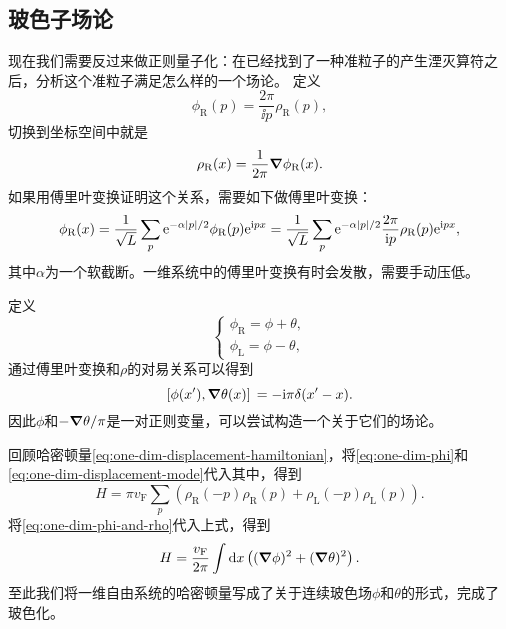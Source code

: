 \subsection{玻色子场论}

现在我们需要反过来做正则量子化：在已经找到了一种准粒子的产生湮灭算符之后，分析这个准粒子满足怎么样的一个场论。
定义
\begin{equation}
    {\phi}_\text{R}(p) = \frac{2\pi}{\ii p} {\rho}_\text{R}(p),
    \label{eq:one-dim-phi}
\end{equation}
切换到坐标空间中就是
\[
    {\rho}_\text{R}(x) = \frac{1}{2\pi} \grad \phi_\text{R}(x).
\]
如果用傅里叶变换证明这个关系，需要如下做傅里叶变换：
\begin{equation}
    {\phi}_\text{R} (x) = \frac{1}{\sqrt{L}} \sum_p \mathrm{e}^{- \alpha \abs{p} / 2} \phi_\text{R}(p) \mathrm{e}^{\mathrm{i} p x} = \frac{1}{\sqrt{L}} \sum_p \mathrm{e}^{- \alpha \abs{p} / 2} \frac{2\pi}{\mathrm{i} p} {\rho}_\text{R}(p) \mathrm{e}^{\mathrm{i} p x},
    \label{eq:one-dim-phi-and-rho}
\end{equation}
其中$\alpha$为一个软截断。一维系统中的傅里叶变换有时会发散，需要手动压低。

定义
\begin{equation}
    \begin{cases}
        {\phi}_\text{R} = {\phi} + {\theta}, \\
        {\phi}_\text{L} = {\phi} - {\theta},
    \end{cases}
\end{equation}
通过傅里叶变换和${\rho}$的对易关系可以得到
\begin{equation}
    \comm*{{\phi}(x')}{\grad {\theta}(x)} = -\ii \pi \delta(x' - x).
\end{equation}
因此$\phi$和$- \grad{\theta} / \pi$是一对正则变量，可以尝试构造一个关于它们的场论。

回顾哈密顿量\eqref{eq:one-dim-displacement-hamiltonian}，将\eqref{eq:one-dim-phi}和\eqref{eq:one-dim-displacement-mode}代入其中，得到
\[
    {H} = \pi v_\text{F} \sum_p \left( {\rho}_\text{R}(-p) {\rho}_\text{R}(p) + {\rho}_\text{L}(-p) {\rho}_\text{L}(p) \right).
\]
将\eqref{eq:one-dim-phi-and-rho}代入上式，得到
\begin{equation}
    H = \frac{v_\text{F}}{2\pi} \int \dd{x} \left( (\grad{\phi})^2 + (\grad{\theta})^2 \right).
\end{equation}
至此我们将一维自由系统的哈密顿量写成了关于连续玻色场$\phi$和$\theta$的形式，完成了玻色化。


